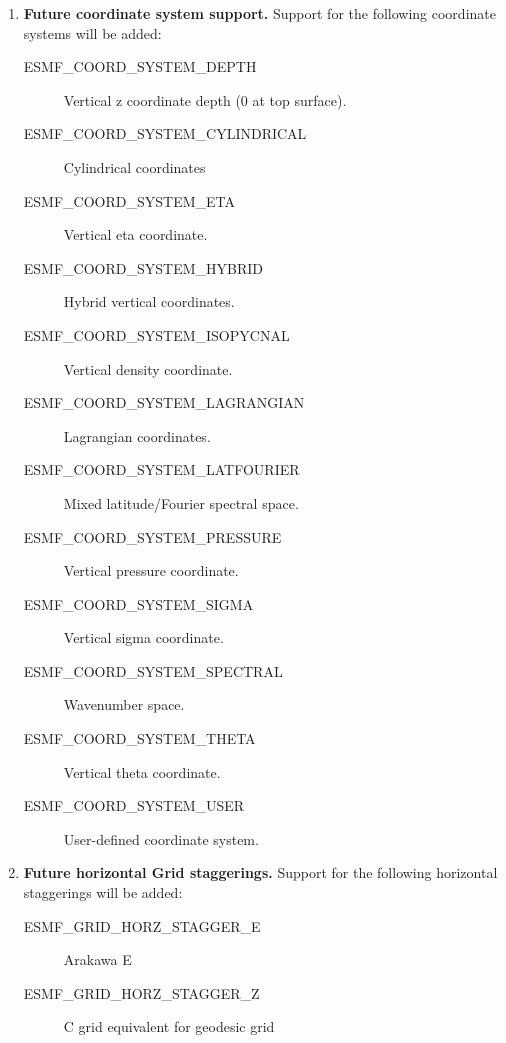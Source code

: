 \begin{enumerate}
\item {\bf Future coordinate system support.}  Support for the following
coordinate systems will be added:
 \begin{description}
    \item [ESMF\_COORD\_SYSTEM\_DEPTH]
          Vertical z coordinate depth (0 at top surface).
    \item [ESMF\_COORD\_SYSTEM\_CYLINDRICAL]
          Cylindrical coordinates
    \item [ESMF\_COORD\_SYSTEM\_ETA]
          Vertical eta coordinate.
    \item [ESMF\_COORD\_SYSTEM\_HYBRID]
          Hybrid vertical coordinates.
    \item [ESMF\_COORD\_SYSTEM\_ISOPYCNAL]
          Vertical density coordinate.
    \item [ESMF\_COORD\_SYSTEM\_LAGRANGIAN]
          Lagrangian coordinates.
    \item [ESMF\_COORD\_SYSTEM\_LATFOURIER]
          Mixed latitude/Fourier spectral space.
    \item [ESMF\_COORD\_SYSTEM\_PRESSURE]
          Vertical pressure coordinate.
    \item [ESMF\_COORD\_SYSTEM\_SIGMA]
          Vertical sigma coordinate.
    \item [ESMF\_COORD\_SYSTEM\_SPECTRAL]
          Wavenumber space.
    \item [ESMF\_COORD\_SYSTEM\_THETA]
          Vertical theta coordinate.
    \item [ESMF\_COORD\_SYSTEM\_USER]
          User-defined coordinate system.
 \end{description}

\item {\bf Future horizontal Grid staggerings.}  Support for the following
horizontal staggerings will be added:
 \begin{description}
    \item [ESMF\_GRID\_HORZ\_STAGGER\_E]
          Arakawa E
    \item [ESMF\_GRID\_HORZ\_STAGGER\_Z]
          C grid equivalent for geodesic grid
 \end{description}


\end{enumerate}
